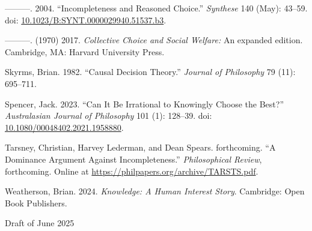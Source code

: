 \documentclass[
  11pt,
  letterpaper,
  DIV=11,
  numbers=noendperiod,
  twoside]{scrartcl}
\newlength{\cslhangindent}
\newenvironment{CSLReferences}[2] %
 {\begin{list}{}{%
  \setlength{\itemindent}{0pt}
  \setlength{\leftmargin}{0pt}
  \setlength{\parsep}{0pt}
  \ifodd #1
   \setlength{\leftmargin}{\cslhangindent}
   \setlength{\itemindent}{-1\cslhangindent}
  \fi
  \setlength{\itemsep}{#2\baselineskip}}}
 {\end{list}}
\begin{document}
\begin{CSLReferences}{1}{0}
---------. 2004. {``Incompleteness and Reasoned Choice.''}
\emph{Synthese} 140 (May): 43--59. doi:
\href{https://doi.org/10.1023/B:SYNT.0000029940.51537.b3}{10.1023/B:SYNT.0000029940.51537.b3}.

---------. (1970) 2017. \emph{Collective Choice and Social Welfare:} An
expanded edition. Cambridge, MA: Harvard University Press.

Skyrms, Brian. 1982. {``Causal Decision Theory.''} \emph{Journal of
Philosophy} 79 (11): 695--711.

Spencer, Jack. 2023. {``Can It Be Irrational to Knowingly Choose the
Best?''} \emph{Australasian Journal of Philosophy} 101 (1): 128--39.
doi:
\href{https://doi.org/10.1080/00048402.2021.1958880}{10.1080/00048402.2021.1958880}.

Tarsney, Christian, Harvey Lederman, and Dean Spears. forthcoming. {``A
Dominance Argument Against Incompleteness.''} \emph{Philosophical
Review}, forthcoming. Online at
\url{https://philpapers.org/archive/TARSTS.pdf}.

Weatherson, Brian. 2024. \emph{Knowledge: A Human Interest Story}.
Cambridge: Open Book Publishers.

\end{CSLReferences}



\noindent Draft of June 2025
\end{document}
